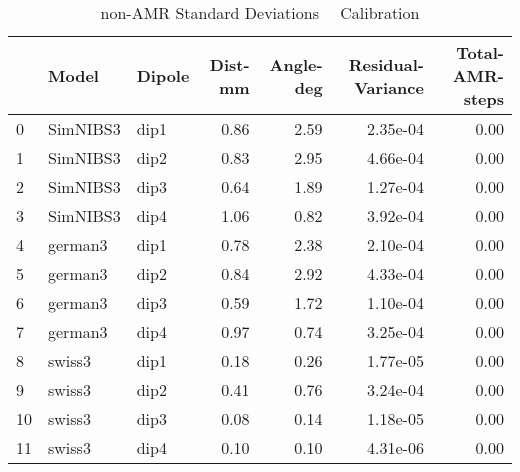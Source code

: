 \documentclass{article}
\begin{document}
\begin{table}
\begin{tabular}{lllrrrr}
\toprule
& Model& Dipole& Dist-mm& Angle-deg& Residual-Variance& Total-AMR-steps\\
\midrule
\rowcolor{lightgray}0 & SimNIBS3 & dip1 & 0.86 & 2.59 & 2.35e-04 & 0.00\\
\rowcolor{lightgray}1 & SimNIBS3 & dip2 & 0.83 & 2.95 & 4.66e-04 & 0.00\\
\rowcolor{lightgray}2 & SimNIBS3 & dip3 & 0.64 & 1.89 & 1.27e-04 & 0.00\\
\rowcolor{lightgray}3 & SimNIBS3 & dip4 & 1.06 & 0.82 & 3.92e-04 & 0.00\\
\rowcolor{yellow}4 & german3 & dip1 & 0.78 & 2.38 & 2.10e-04 & 0.00\\
\rowcolor{yellow}5 & german3 & dip2 & 0.84 & 2.92 & 4.33e-04 & 0.00\\
\rowcolor{yellow}6 & german3 & dip3 & 0.59 & 1.72 & 1.10e-04 & 0.00\\
\rowcolor{yellow}7 & german3 & dip4 & 0.97 & 0.74 & 3.25e-04 & 0.00\\
\rowcolor{pink}8 & swiss3 & dip1 & 0.18 & 0.26 & 1.77e-05 & 0.00\\
\rowcolor{pink}9 & swiss3 & dip2 & 0.41 & 0.76 & 3.24e-04 & 0.00\\
\rowcolor{pink}10 & swiss3 & dip3 & 0.08 & 0.14 & 1.18e-05 & 0.00\\
\rowcolor{pink}11 & swiss3 & dip4 & 0.10 & 0.10 & 4.31e-06 & 0.00\\
\end{tabular}
\caption{non-AMR Standard Deviations \ \textemdash \ Calibration}
\end{table}
\end{document}
